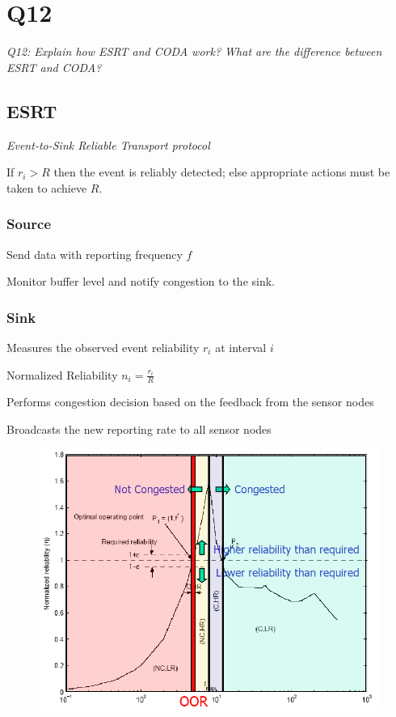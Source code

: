\chapter{Q12}
\emph{Q12: Explain how ESRT and CODA work? What are the difference between ESRT
and CODA?}

\section{ESRT}
\emph{Event-to-Sink Reliable Transport protocol}

If $r_i > R$ then the event is reliably detected; else appropriate actions must
be taken to achieve $R$.

\subsection{Source}
\begin{description}
	\item Send data with reporting frequency $f$ 
	\item Monitor buffer level and notify congestion to the sink.
\end{description}

\subsection{Sink}

\begin{description}
	\item Measures the observed event reliability $r_i$ at interval $i$
	\item Normalized Reliability $n_i = \frac{r_i}{R}$
	\item Performs congestion decision based on the feedback from the sensor
		nodes
	\item Broadcasts the new reporting rate to all sensor nodes
\end{description}

\begin{figure}[h]
	\centering
	\includegraphics[scale=0.4]{img/CongestionDetection-ESRT.png}
\end{figure}

